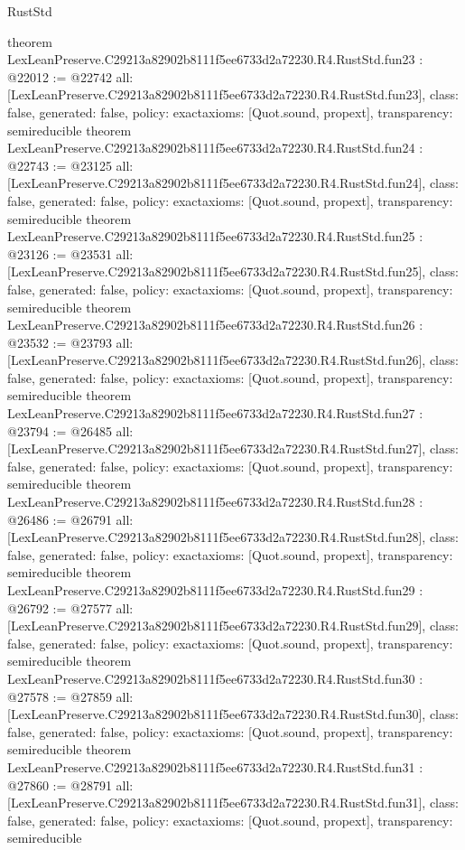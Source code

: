 \begin{lexlean}{RustStd}
\begin{coremodule}
{}
theorem LexLeanPreserve.C29213a82902b8111f5ee6733d2a72230.R4.RustStd.fun23 : @22012 := @22742 {
  all: [LexLeanPreserve.C29213a82902b8111f5ee6733d2a72230.R4.RustStd.fun23],
  class: false,
  generated: false,
  policy: exact{axioms: [Quot.sound, propext]},
  transparency: semireducible
}
theorem LexLeanPreserve.C29213a82902b8111f5ee6733d2a72230.R4.RustStd.fun24 : @22743 := @23125 {
  all: [LexLeanPreserve.C29213a82902b8111f5ee6733d2a72230.R4.RustStd.fun24],
  class: false,
  generated: false,
  policy: exact{axioms: [Quot.sound, propext]},
  transparency: semireducible
}
theorem LexLeanPreserve.C29213a82902b8111f5ee6733d2a72230.R4.RustStd.fun25 : @23126 := @23531 {
  all: [LexLeanPreserve.C29213a82902b8111f5ee6733d2a72230.R4.RustStd.fun25],
  class: false,
  generated: false,
  policy: exact{axioms: [Quot.sound, propext]},
  transparency: semireducible
}
theorem LexLeanPreserve.C29213a82902b8111f5ee6733d2a72230.R4.RustStd.fun26 : @23532 := @23793 {
  all: [LexLeanPreserve.C29213a82902b8111f5ee6733d2a72230.R4.RustStd.fun26],
  class: false,
  generated: false,
  policy: exact{axioms: [Quot.sound, propext]},
  transparency: semireducible
}
theorem LexLeanPreserve.C29213a82902b8111f5ee6733d2a72230.R4.RustStd.fun27 : @23794 := @26485 {
  all: [LexLeanPreserve.C29213a82902b8111f5ee6733d2a72230.R4.RustStd.fun27],
  class: false,
  generated: false,
  policy: exact{axioms: [Quot.sound, propext]},
  transparency: semireducible
}
theorem LexLeanPreserve.C29213a82902b8111f5ee6733d2a72230.R4.RustStd.fun28 : @26486 := @26791 {
  all: [LexLeanPreserve.C29213a82902b8111f5ee6733d2a72230.R4.RustStd.fun28],
  class: false,
  generated: false,
  policy: exact{axioms: [Quot.sound, propext]},
  transparency: semireducible
}
theorem LexLeanPreserve.C29213a82902b8111f5ee6733d2a72230.R4.RustStd.fun29 : @26792 := @27577 {
  all: [LexLeanPreserve.C29213a82902b8111f5ee6733d2a72230.R4.RustStd.fun29],
  class: false,
  generated: false,
  policy: exact{axioms: [Quot.sound, propext]},
  transparency: semireducible
}
theorem LexLeanPreserve.C29213a82902b8111f5ee6733d2a72230.R4.RustStd.fun30 : @27578 := @27859 {
  all: [LexLeanPreserve.C29213a82902b8111f5ee6733d2a72230.R4.RustStd.fun30],
  class: false,
  generated: false,
  policy: exact{axioms: [Quot.sound, propext]},
  transparency: semireducible
}
theorem LexLeanPreserve.C29213a82902b8111f5ee6733d2a72230.R4.RustStd.fun31 : @27860 := @28791 {
  all: [LexLeanPreserve.C29213a82902b8111f5ee6733d2a72230.R4.RustStd.fun31],
  class: false,
  generated: false,
  policy: exact{axioms: [Quot.sound, propext]},
  transparency: semireducible
}
\end{coremodule}
\end{lexlean}
